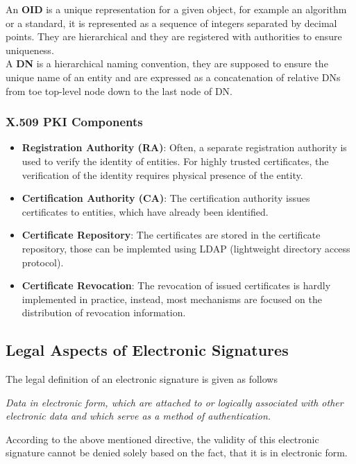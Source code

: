 \documentclass[a4paper, 10 pt, conference]{ieeeconf}
\begin{document}
\pagebreak

An \textbf{OID} is a unique representation for a given object, for example an algorithm or a standard, it is represented as a sequence of integers separated by decimal points. They are hierarchical and they are registered with authorities to ensure uniqueness. \\
A \textbf{DN} is a hierarchical naming convention, they are supposed to ensure the unique name of an entity and are expressed as a concatenation of relative DNs from toe top-level node down to the last node of DN. 

\subsubsection{\textbf{X.509 PKI Components}}
\begin{itemize}
\item \textbf{Registration Authority (RA)}: Often, a separate registration authority is used to verify the identity of entities. For highly trusted certificates, the verification of the identity requires physical presence of the entity.
\item \textbf{Certification Authority (CA)}: The certification authority issues certificates to entities, which have already been identified. 
\item \textbf{Certificate Repository}: The certificates are stored in the certificate repository, those can be implemted using LDAP (lightweight directory access protocol).
\item \textbf{Certificate Revocation}: The revocation of issued certificates is hardly implemented in practice, instead, most mechanisms are focused on the distribution of revocation information. 
\end{itemize}


\vspace{0.5cm}
\subsection{\textbf{Legal Aspects of Electronic Signatures}}
The legal definition of an electronic signature is given as follows
\begin{center}
\textit{Data in electronic form, which are attached to or logically associated with other electronic data and which serve as a method of authentication.}
\end{center}
According to the above mentioned directive, the validity of this electronic signature cannot be denied solely based on the fact, that it is in electronic form. 
\end{document}
